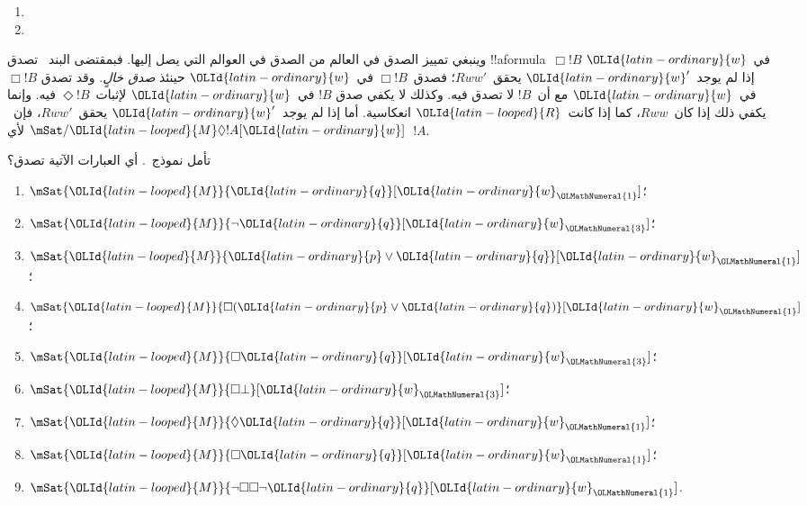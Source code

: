 \documentclass[../../../include/open-logic-section]{subfiles}
\begin{document}
\begin{defn}
\begin{enumerate}
  \item{}
  \item{}
  \end{enumerate}
\end{defn}

وينبغي تمييز الصدق في العالم من الصدق في العوالم التي يصل إليها.
فبمقتضى البند~ تصدق
!!a{formula}~$\Box !B$ في~$\OLId{latin-ordinary}{w}$ إذا لم يوجد~$\OLId{latin-ordinary}{w}'$ يحقق~$Rww'$؛
فصدق~$\Box !B$ في~$\OLId{latin-ordinary}{w}$ حينئذ \emph{صدق خالٍ}. وقد تصدق
$\Box !B$ في~$\OLId{latin-ordinary}{w}$ مع أن~$!B$ لا تصدق فيه. وكذلك لا يكفي صدق
$!B$ في~$\OLId{latin-ordinary}{w}$ لإثبات~$\Diamond !B$ فيه. وإنما يكفي ذلك إذا كان~$Rww$،
كما إذا كانت~$\OLId{latin-looped}{R}$ انعكاسية. أما إذا لم يوجد~$\OLId{latin-ordinary}{w}'$ يحقق~$Rww'$،
فإن~$\mSat/{\OLId{latin-looped}{M}}{\Diamond !A}[\OLId{latin-ordinary}{w}]$ لأي~$!A$.

\begin{prob}
  تأمل نموذج~. أي العبارات الآتية
  تصدق؟
    \begin{enumerate}
    \item $\mSat{\OLId{latin-looped}{M}}{\OLId{latin-ordinary}{q}}[\OLId{latin-ordinary}{w}_\OLMathNumeral{1}]$؛
    \item $\mSat{\OLId{latin-looped}{M}}{\lnot \OLId{latin-ordinary}{q}}[\OLId{latin-ordinary}{w}_\OLMathNumeral{3}]$؛
    \item $\mSat{\OLId{latin-looped}{M}}{\OLId{latin-ordinary}{p} \lor \OLId{latin-ordinary}{q}}[\OLId{latin-ordinary}{w}_\OLMathNumeral{1}]$؛
    \item $\mSat{\OLId{latin-looped}{M}}{\Box (\OLId{latin-ordinary}{p} \lor \OLId{latin-ordinary}{q})}[\OLId{latin-ordinary}{w}_\OLMathNumeral{1}]$؛
    \item $\mSat{\OLId{latin-looped}{M}}{\Box \OLId{latin-ordinary}{q}}[\OLId{latin-ordinary}{w}_\OLMathNumeral{3}]$؛
    \item $\mSat{\OLId{latin-looped}{M}}{\Box \bot}[\OLId{latin-ordinary}{w}_\OLMathNumeral{3}]$؛
    \item $\mSat{\OLId{latin-looped}{M}}{\Diamond \OLId{latin-ordinary}{q}}[\OLId{latin-ordinary}{w}_\OLMathNumeral{1}]$؛
    \item $\mSat{\OLId{latin-looped}{M}}{\Box \OLId{latin-ordinary}{q}}[\OLId{latin-ordinary}{w}_\OLMathNumeral{1}]$؛
    \item $\mSat{\OLId{latin-looped}{M}}{\lnot \Box\Box \lnot \OLId{latin-ordinary}{q}}[\OLId{latin-ordinary}{w}_\OLMathNumeral{1}]$.
    \end{enumerate}
\end{prob}
\end{document}

